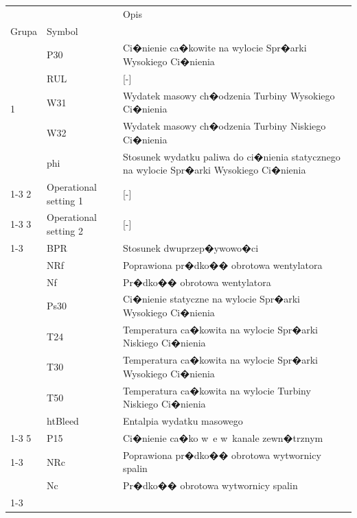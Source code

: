 \begin{tabular}{lll}
\toprule
 &  & Opis \\
Grupa & Symbol &  \\
\midrule
\multirow[t]{5}{*}{1} & P30 & Ci�nienie ca�kowite na wylocie Spr�arki Wysokiego Ci�nienia \\
 & RUL & [-] \\
 & W31 & Wydatek masowy ch�odzenia Turbiny Wysokiego Ci�nienia \\
 & W32 & Wydatek masowy ch�odzenia Turbiny Niskiego Ci�nienia \\
 & phi & Stosunek wydatku paliwa do ci�nienia statycznego na wylocie Spr�arki Wysokiego Ci�nienia \\
\cline{1-3}
2 & Operational setting 1 & [-] \\
\cline{1-3}
3 & Operational setting 2 & [-] \\
\cline{1-3}
\multirow[t]{8}{*}{4} & BPR & Stosunek dwuprzep�ywowo�ci \\
 & NRf & Poprawiona pr�dko�� obrotowa wentylatora \\
 & Nf & Pr�dko�� obrotowa wentylatora \\
 & Ps30 & Ci�nienie statyczne na wylocie Spr�arki Wysokiego Ci�nienia \\
 & T24 & Temperatura ca�kowita na wylocie Spr�arki Niskiego Ci�nienia \\
 & T30 & Temperatura ca�kowita na wylocie Spr�arki Wysokiego Ci�nienia \\
 & T50 & Temperatura ca�kowita na wylocie Turbiny Niskiego Ci�nienia \\
 & htBleed & Entalpia wydatku masowego \\
\cline{1-3}
5 & P15 & Ci�nienie ca�ko w~e w~kanale zewn�trznym \\
\cline{1-3}
\multirow[t]{2}{*}{6} & NRc & Poprawiona pr�dko�� obrotowa wytwornicy spalin \\
 & Nc & Pr�dko�� obrotowa wytwornicy spalin \\
\cline{1-3}
\bottomrule
\end{tabular}
